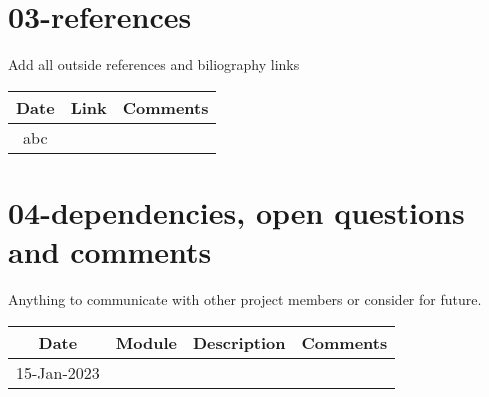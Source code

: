 \documentclass[
]{book}
\begin{document}
\hypertarget{references-2}{%
\section{03-references}\label{references-2}}

Add all outside references and biliography links

\begin{longtable}[]{@{}cll@{}}
\toprule()
Date & Link & Comments \\
\midrule()
\endhead
abc & & \\
\bottomrule()
\end{longtable}

\hypertarget{dependencies-open-questions-and-comments-2}{%
\section{04-dependencies, open questions and comments}\label{dependencies-open-questions-and-comments-2}}

Anything to communicate with other project members or consider for future.

\begin{longtable}[]{@{}clll@{}}
\toprule()
Date & Module & Description & Comments \\
\midrule()
\endhead
15-Jan-2023 & & & \\
\bottomrule()
\end{longtable}

  
\end{document}
